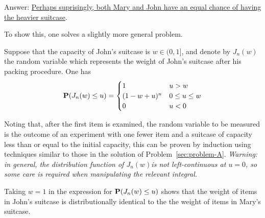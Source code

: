 \documentclass[british,a4paper]{article}
\begin{document}
Answer: \uline{Perhaps suprisingly, both Mary and John have an equal chance of having the heavier suitcase}.

To show this, one solves a slightly more general problem.

Suppose that the capacity of John's suitcase is \(w \in (0, 1]\), and denote by \(J_n(w)\) the random variable which represents the weight of John's suitcase after his packing procedure. One has
\[
\operatorname{\mathbf{P}}(J_n(w) \leq u) =
\begin{cases}
1 & u > w\\
(1 - w + u)^n & 0 \leq u \leq w\\
0 & u < 0
\end{cases}
\]

Noting that, after the first item is examined, the random variable to be measured is the outcome of an experiment with one fewer item and a suitcase of capacity less than or equal to the initial capacity, this can be proven by induction using techniques similar to those in the solution of Problem~\ref{sec:problem-A}. \emph{Warning: in general, the distribution function of \(J_n(w)\)is not left-continuous at \(u = 0\), so some care is required when manipulating the relevant integral.}

Taking \(w = 1\) in the expression for \(\operatorname{\mathbf{P}}(J_n(w) \leq u)\) shows that the weight of items in John's suitcase is distributionally identical to the the weight of items in Mary's suitcase.
\end{document}
